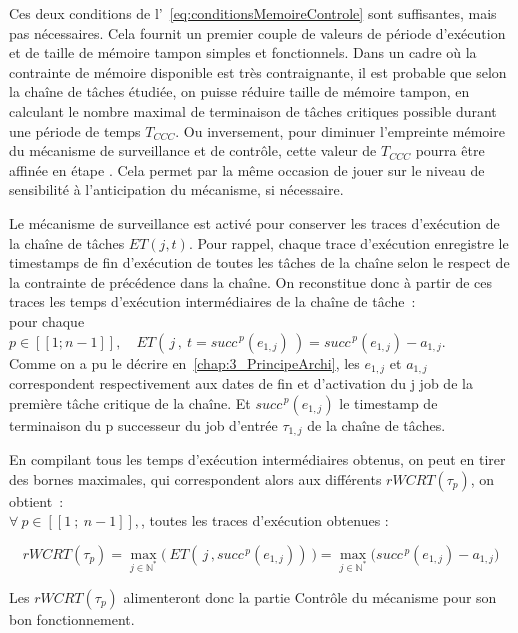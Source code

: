 \documentclass[french, a4paper, 11pt, twoside, pdftex]{StyleThese}
\begin{document}
    		Ces deux conditions de l'~\autoref{eq:conditionsMemoireControle} sont suffisantes, mais pas nécessaires. Cela fournit un premier couple de valeurs de période d'exécution et de taille de mémoire tampon simples et fonctionnels. Dans un cadre où la contrainte de mémoire disponible est très contraignante, il est probable que selon la chaîne de tâches étudiée, on puisse réduire taille de mémoire tampon, en calculant le nombre maximal de terminaison de tâches critiques possible durant une période de temps $T_{CCC}$.
    		Ou inversement, pour diminuer l'empreinte mémoire du mécanisme de surveillance et de contrôle, cette valeur de $T_{CCC}$ pourra être affinée en étape . Cela permet par la même occasion de jouer sur le niveau de sensibilité à l'anticipation du mécanisme, si nécessaire.
    		
    		Le mécanisme de surveillance est activé pour conserver les traces d'exécution de la chaîne de tâches $ET(j,t)$. 
    		Pour rappel, chaque trace d'exécution enregistre le timestamps de fin d'exécution de toutes les tâches de la chaîne selon le respect de la contrainte de précédence dans la chaîne. On reconstitue donc à partir de ces traces les temps d'exécution intermédiaires de la chaîne de tâche~: \\
    		pour chaque $p \in [\![1;n-1]\!], \quad ET(\,j\,,~t=succ^{\,p}(e_{1,j})~) = succ^{\,p}(e_{1,j}) - a_{1,j}$. \\
    		Comme on a pu le décrire en~\autoref{chap:3_PrincipeArchi}, les $e_{1,j}$ et $a_{1,j}$ correspondent respectivement aux dates de fin et d'activation du j job de la première tâche critique de la chaîne. Et $succ^{\,p}(e_{1,j})$ le timestamp de terminaison du p successeur du job d'entrée $\tau_{1,j}$ de la chaîne de tâches.
    		
    		En compilant tous les temps d'exécution intermédiaires obtenus, on peut en tirer des bornes maximales, qui correspondent alors aux différents $ rWCRT(\tau_p) $, on obtient~: \\
    		$\forall \ p \in [\![1\ ;\ n-1]\!], $, toutes les traces d'exécution obtenues :
    		
    		\begin{equation}
    			rWCRT(\tau_p) = \max_{j \in \mathbb{N^*}}\Big(~ET(\,j\,, succ^{\,p}(e_{1,j}) )~\Big) = \max_{j \in \mathbb{N^*}}\Big( succ^{\,p}(e_{1,j}) - a_{1,j} \Big) 
    		\end{equation} 
    	
    		Les $rWCRT(\tau_p)$ alimenteront donc la partie Contrôle du mécanisme pour son bon fonctionnement.
                    
\end{document}

